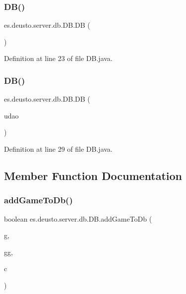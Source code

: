 \subsubsection{\texorpdfstring{D\+B()}{DB()}\hspace{0.1cm}{\footnotesize\ttfamily [1/2]}}
{\footnotesize\ttfamily es.\+deusto.\+server.\+db.\+D\+B.\+DB (\begin{DoxyParamCaption}{ }\end{DoxyParamCaption})}



Definition at line 23 of file D\+B.\+java.

\mbox{\label{classes_1_1deusto_1_1server_1_1db_1_1_d_b_abcfd35c624e742697bc2b1d1df8cc92a}} 
\subsubsection{\texorpdfstring{D\+B()}{DB()}\hspace{0.1cm}{\footnotesize\ttfamily [2/2]}}
{\footnotesize\ttfamily es.\+deusto.\+server.\+db.\+D\+B.\+DB (\begin{DoxyParamCaption}\item[{\hyperlink{interfacees_1_1deusto_1_1server_1_1db_1_1dao_1_1_i_d_a_o}{I\+D\+AO}}]{udao }\end{DoxyParamCaption})}



Definition at line 29 of file D\+B.\+java.



\subsection{Member Function Documentation}
\mbox{\label{classes_1_1deusto_1_1server_1_1db_1_1_d_b_a376112d91f8e3018821fd9362f6598ae}} 
\subsubsection{\texorpdfstring{add\+Game\+To\+Db()}{addGameToDb()}}
{\footnotesize\ttfamily boolean es.\+deusto.\+server.\+db.\+D\+B.\+add\+Game\+To\+Db (\begin{DoxyParamCaption}\item[{\hyperlink{classes_1_1deusto_1_1server_1_1db_1_1data_1_1_game}{Game}}]{g,  }\item[{\hyperlink{classes_1_1deusto_1_1server_1_1db_1_1data_1_1_genre}{Genre}}]{gg,  }\item[{\hyperlink{classes_1_1deusto_1_1server_1_1db_1_1data_1_1_company}{Company}}]{c }\end{DoxyParamCaption})}



